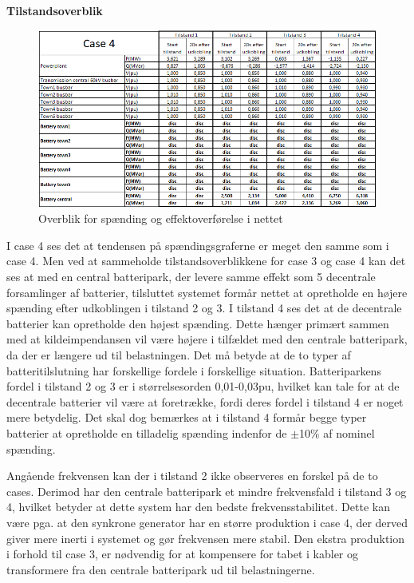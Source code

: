 \newpage
\textbf{Tilstandsoverblik}
\begin{figure}[H] %
	\centering
	\includegraphics[width=1\textwidth]{figurer/LargeDisturbanceBatterypark/Overview}
	\caption{Overblik for spænding og effektoverførelse i nettet}
	\label{fig:C4Overview}
\end{figure}

I case 4 ses det at tendensen på spændingsgraferne er meget den samme som i case 4. Men ved at sammeholde tilstandsoverblikkene for case 3 og case 4 kan det ses at med en central batteripark, der levere samme effekt som 5 decentrale forsamlinger af batterier, tilsluttet systemet formår nettet at opretholde en højere spænding efter udkoblingen i tilstand 2 og 3. I tilstand 4 ses det at de decentrale batterier kan opretholde den højest spænding. Dette hænger primært sammen med at kildeimpendansen vil være højere i tilfældet med den centrale batteripark, da der er længere ud til belastningen. Det må betyde at de to typer af batteritilslutning har forskellige fordele i forskellige situation. Batteriparkens fordel i tilstand 2 og 3 er i størrelsesorden 0,01-0,03pu, hvilket kan tale for at de decentrale batterier vil være at foretrække, fordi deres fordel i tilstand 4 er noget mere betydelig. Det skal dog bemærkes at i tilstand 4 formår begge typer batterier at opretholde en tilladelig spænding indenfor de $\pm$10\% af nominel spænding.

Angående frekvensen kan der i tilstand 2 ikke observeres en forskel på de to cases. Derimod har den centrale batteripark et mindre frekvensfald i tilstand 3 og 4, hvilket betyder at dette system har den bedste frekvensstabilitet. Dette kan være pga. at den synkrone generator har en større produktion i case 4, der derved giver mere inerti i systemet og gør frekvensen mere stabil. Den ekstra produktion i forhold til case 3, er nødvendig for at kompensere for tabet i kabler og transformere fra den centrale batteripark ud til belastningerne.
